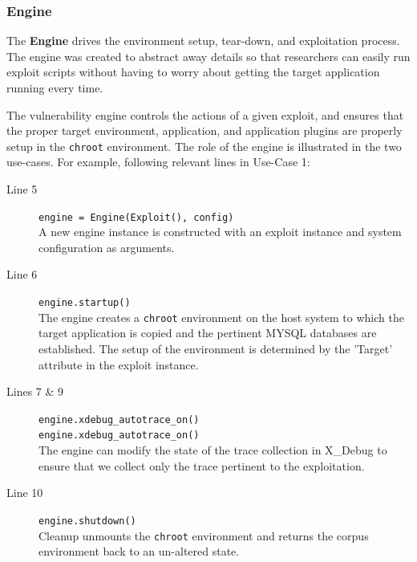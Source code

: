 \documentclass[letterpaper,twocolumn,10pt]{article}
\begin{document}
\subsubsection{Engine}
The {\bf Engine} drives the environment setup, tear-down, and exploitation process. The engine was created to abstract away details so that researchers can easily run exploit scripts without having to worry about getting the target application running every time. \par
The vulnerability engine controls the actions of a given exploit, and ensures that the proper target environment, application, and application plugins are properly setup in the {\tt chroot} environment. The role of the engine is illustrated in the two use-cases. For example, following relevant lines in Use-Case 1:
\begin{description}
  \item[Line 5] {\tt \footnotesize    engine = Engine(Exploit(), config)} \\ A new engine instance is constructed with an exploit instance and system configuration as arguments.
  \item[Line 6] {\tt \footnotesize     engine.startup()} \\The engine creates a {\tt chroot} environment on the host system to which the target application is copied and the pertinent MYSQL databases are established. The setup of the environment is determined by the 'Target' attribute in the exploit instance. 
  \item[Lines 7 \& 9] {\tt \footnotesize engine.xdebug\_autotrace\_on()\\ engine.xdebug\_autotrace\_on()}\\The engine can modify the state of the trace collection in X\_Debug to ensure that we collect only the trace pertinent to the exploitation.
  \item[Line 10] {\tt \footnotesize engine.shutdown()}\\Cleanup unmounts the {\tt chroot} environment and returns the corpus environment back to an un-altered state.
\end{description}



\end{document}
